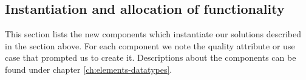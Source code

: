 

\subsection{Instantiation and allocation of functionality}
    This section lists the new components which instantiate our solutions
    described in the section above. For each component we note the quality
    attribute or use case that prompted us to create it. Descriptions about
    the components can be found under chapter \ref{ch:elements-datatypes}. \\

